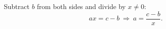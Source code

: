 Subtract $b$ from both sides and divide by $x\ne0$:
\[
ax=c-b\ \Rightarrow\ \boxed{a=\dfrac{c-b}{x}}.
\]
